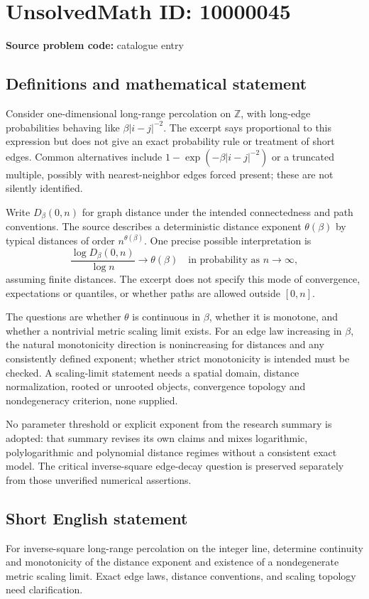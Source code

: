 \documentclass[11pt]{article}
\newcommand{\Z}{\mathbb{Z}}
\begin{document}
\section*{UnsolvedMath ID: 10000045}
\textbf{Source problem code:} catalogue entry
\subsection{Definitions and mathematical statement}
Consider one-dimensional long-range percolation on \(\Z\), with long-edge probabilities behaving like \(\beta|i-j|^{-2}\). The excerpt says proportional to this expression but does not give an exact probability rule or treatment of short edges. Common alternatives include \(1-\exp(-\beta|i-j|^{-2})\) or a truncated multiple, possibly with nearest-neighbor edges forced present; these are not silently identified.

Write \(D_\beta(0,n)\) for graph distance under the intended connectedness and path conventions. The source describes a deterministic distance exponent \(\theta(\beta)\) by typical distances of order \(n^{\theta(\beta)}\). One precise possible interpretation is
\[
 \frac{\log D_\beta(0,n)}{\log n}\longrightarrow\theta(\beta)
 \quad\text{in probability as }n\to\infty,
\]
assuming finite distances. The excerpt does not specify this mode of convergence, expectations or quantiles, or whether paths are allowed outside \([0,n]\).

The questions are whether \(\theta\) is continuous in \(\beta\), whether it is monotone, and whether a nontrivial metric scaling limit exists. For an edge law increasing in \(\beta\), the natural monotonicity direction is nonincreasing for distances and any consistently defined exponent; whether strict monotonicity is intended must be checked. A scaling-limit statement needs a spatial domain, distance normalization, rooted or unrooted objects, convergence topology and nondegeneracy criterion, none supplied.

No parameter threshold or explicit exponent from the research summary is adopted: that summary revises its own claims and mixes logarithmic, polylogarithmic and polynomial distance regimes without a consistent exact model. The critical inverse-square edge-decay question is preserved separately from those unverified numerical assertions.
\subsection{Short English statement}
For inverse-square long-range percolation on the integer line, determine continuity and monotonicity of the distance exponent and existence of a nondegenerate metric scaling limit. Exact edge laws, distance conventions, and scaling topology need clarification.
\end{document}
